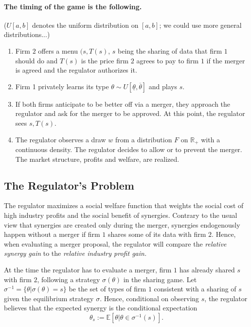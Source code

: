 \documentclass[a4paper]{article}
\newcommand{\E}{\mathbb E}
\renewcommand{\t}{\theta}
\begin{document}
\paragraph{The timing of the game is the following.} ($U[a,b]$ denotes the uniform distribution on $[a,b]$; we could use more general distributions...)
\begin{enumerate}\setlength\itemsep{0em}
    \item Firm $2$ offers a menu $(s,T(s)$, $s$ being the sharing of data that firm $1$ should do and $T(s)$ is the price firm $2$ agrees to pay to firm $1$ if the merger is agreed and the regulator authorizes it. 
    \item Firm 1 privately learns its type $\t\sim U[\underline{\t},\overline{\t}]$ and plays $s$.
    \item If both firms anticipate to be better off via a merger, they approach the regulator and ask for the merger to be approved. At this point, the regulator sees $s,T(s)$.
    \item The regulator observes a draw $w$ from a distribution $F$ on $\mathbb R_+$ with a continuous density. The regulator decides to allow or to prevent the merger. The market structure, profits and welfare, are realized.
\end{enumerate}
%
\subsection{The Regulator's Problem}
   The regulator maximizes a social welfare function that weights the social cost of high industry profits and the social benefit of synergies. Contrary to the usual view that synergies are created only during the merger, synergies endogenously happen without a merger if firm $1$ shares some of its data with firm $2$. Hence, when evaluating a merger proposal, the regulator will compare the \emph{relative synergy gain} to the \emph{relative industry profit gain.}

   At the time the regulator has to evaluate a merger, firm $1$ has already shared $s$ with firm $2$, following a strategy $\sigma(\t)$ in the sharing game.  Let $\sigma^{-1}=\{\t|\sigma(\t)=s\}$ be the set of types of firm $1$ consistent with a sharing of $s$ given the equilibrium strategy $\sigma$. Hence, conditional on observing $s$, the regulator believes that the expected synergy is the conditional expectation $$\t_s:=\E[\t|\t\in\sigma^{-1}(s)].$$
     
\end{document}
